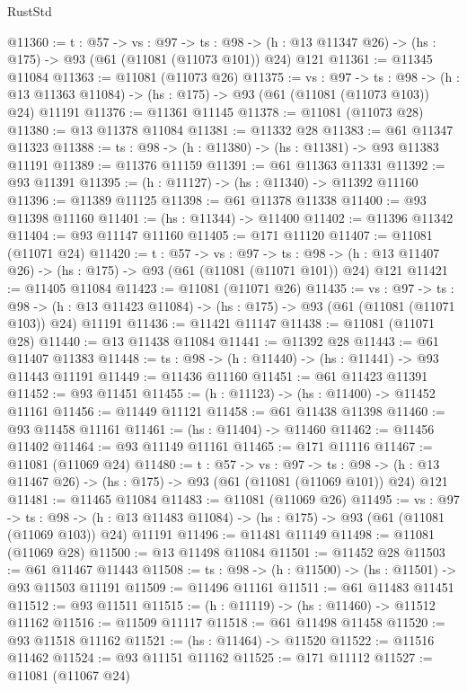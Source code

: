 \begin{lexlean}{RustStd}
\begin{coremodule}
@11360 := {t : @57} ->
  {vs : @97} ->
  {ts : @98} -> (h : @13 @11347 @26) -> (hs : @175) -> @93 (@61 (@11081 (@11073 @101)) @24) @121
@11361 := @11345 @11084
@11363 := @11081 (@11073 @26)
@11375 := {vs : @97} ->
  {ts : @98} ->
  (h : @13 @11363 @11084) -> (hs : @175) -> @93 (@61 (@11081 (@11073 @103)) @24) @11191
@11376 := @11361 @11145
@11378 := @11081 (@11073 @28)
@11380 := @13 @11378 @11084
@11381 := @11332 @28
@11383 := @61 @11347 @11323
@11388 := {ts : @98} -> (h : @11380) -> (hs : @11381) -> @93 @11383 @11191
@11389 := @11376 @11159
@11391 := @61 @11363 @11331
@11392 := @93 @11391
@11395 := (h : @11127) -> (hs : @11340) -> @11392 @11160
@11396 := @11389 @11125
@11398 := @61 @11378 @11338
@11400 := @93 @11398 @11160
@11401 := (hs : @11344) -> @11400
@11402 := @11396 @11342
@11404 := @93 @11147 @11160
@11405 := @171 @11120
@11407 := @11081 (@11071 @24)
@11420 := {t : @57} ->
  {vs : @97} ->
  {ts : @98} -> (h : @13 @11407 @26) -> (hs : @175) -> @93 (@61 (@11081 (@11071 @101)) @24) @121
@11421 := @11405 @11084
@11423 := @11081 (@11071 @26)
@11435 := {vs : @97} ->
  {ts : @98} ->
  (h : @13 @11423 @11084) -> (hs : @175) -> @93 (@61 (@11081 (@11071 @103)) @24) @11191
@11436 := @11421 @11147
@11438 := @11081 (@11071 @28)
@11440 := @13 @11438 @11084
@11441 := @11392 @28
@11443 := @61 @11407 @11383
@11448 := {ts : @98} -> (h : @11440) -> (hs : @11441) -> @93 @11443 @11191
@11449 := @11436 @11160
@11451 := @61 @11423 @11391
@11452 := @93 @11451
@11455 := (h : @11123) -> (hs : @11400) -> @11452 @11161
@11456 := @11449 @11121
@11458 := @61 @11438 @11398
@11460 := @93 @11458 @11161
@11461 := (hs : @11404) -> @11460
@11462 := @11456 @11402
@11464 := @93 @11149 @11161
@11465 := @171 @11116
@11467 := @11081 (@11069 @24)
@11480 := {t : @57} ->
  {vs : @97} ->
  {ts : @98} -> (h : @13 @11467 @26) -> (hs : @175) -> @93 (@61 (@11081 (@11069 @101)) @24) @121
@11481 := @11465 @11084
@11483 := @11081 (@11069 @26)
@11495 := {vs : @97} ->
  {ts : @98} ->
  (h : @13 @11483 @11084) -> (hs : @175) -> @93 (@61 (@11081 (@11069 @103)) @24) @11191
@11496 := @11481 @11149
@11498 := @11081 (@11069 @28)
@11500 := @13 @11498 @11084
@11501 := @11452 @28
@11503 := @61 @11467 @11443
@11508 := {ts : @98} -> (h : @11500) -> (hs : @11501) -> @93 @11503 @11191
@11509 := @11496 @11161
@11511 := @61 @11483 @11451
@11512 := @93 @11511
@11515 := (h : @11119) -> (hs : @11460) -> @11512 @11162
@11516 := @11509 @11117
@11518 := @61 @11498 @11458
@11520 := @93 @11518 @11162
@11521 := (hs : @11464) -> @11520
@11522 := @11516 @11462
@11524 := @93 @11151 @11162
@11525 := @171 @11112
@11527 := @11081 (@11067 @24)

\end{coremodule}
\end{lexlean}
